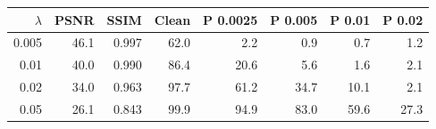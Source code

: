 \begin{tabular}{rrrrrrrr}
\toprule
$\lambda$ & PSNR & SSIM & Clean & P 0.0025 & P 0.005 & P 0.01 & P 0.02 \\
\midrule
0.005 & 46.1 & 0.997 & 62.0 & 2.2 & 0.9 & 0.7 & 1.2 \\
0.01 & 40.0 & 0.990 & 86.4 & 20.6 & 5.6 & 1.6 & 2.1 \\
0.02 & 34.0 & 0.963 & 97.7 & 61.2 & 34.7 & 10.1 & 2.1 \\
0.05 & 26.1 & 0.843 & 99.9 & 94.9 & 83.0 & 59.6 & 27.3 \\
\bottomrule
\end{tabular}
